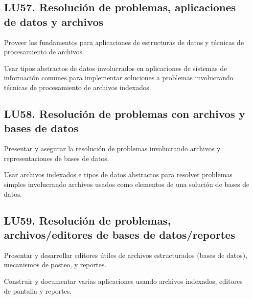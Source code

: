 \subsection{LU57. Resolución de problemas, aplicaciones de datos y archivos}\label{sec:LU57}
\begin{LearningUnit}
\begin{LUGoal}
\item Proveer los fundamentos para aplicaciones de estructuras de datos y técnicas de procesamiento de archivos.
\end{LUGoal}

\begin{LUObjective}
\item Usar tipos abstractos de datos involucrados en aplicaciones de sistemas de información comunes para implementar soluciones a problemas involucrando técnicas de procesamiento de archivos indexados.
\end{LUObjective}
\end{LearningUnit}

\subsection{LU58. Resolución de problemas con archivos y bases de datos}\label{sec:LU58}
\begin{LearningUnit}
\begin{LUGoal}
\item Presentar y asegurar la resolución de problemas involucrando archivos y representaciones de bases de datos.
\end{LUGoal}

\begin{LUObjective}
\item Usar archivos indexados e tipos de datos abstractos para resolver problemas simples involucrando archivos usados como elementos de una solución de bases de datos.
\end{LUObjective}
\end{LearningUnit}

\subsection{LU59. Resolución de problemas, archivos/editores de bases de datos/reportes}\label{sec:LU59}
\begin{LearningUnit}
\begin{LUGoal}
\item Presentar y desarrollar editores útiles de archivos estructurados (bases de datos), mecanismos de posteo, y reportes.
\end{LUGoal}

\begin{LUObjective}
\item Construir y documentar varias aplicaciones usando archivos indexados, editores de pantalla y reportes.
\end{LUObjective}
\end{LearningUnit}

